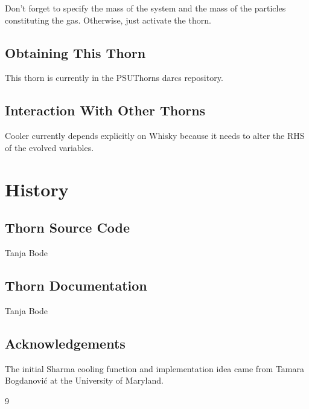 Don't forget to specify the mass of the system and the mass of the particles 
constituting the gas.  Otherwise, just activate the thorn.

\subsection{Obtaining This Thorn}

This thorn is currently in the PSUThorns darcs repository.

\subsection{Interaction With Other Thorns}

Cooler currently depends explicitly on Whisky because it needs to alter
the RHS of the evolved variables.

\section{History}

\subsection{Thorn Source Code}

Tanja Bode

\subsection{Thorn Documentation}

Tanja Bode

\subsection{Acknowledgements}

The initial Sharma cooling function and implementation idea came from Tamara Bogdanovi\'{c} at the University of Maryland. 

\begin{thebibliography}{9}

\end{thebibliography}




